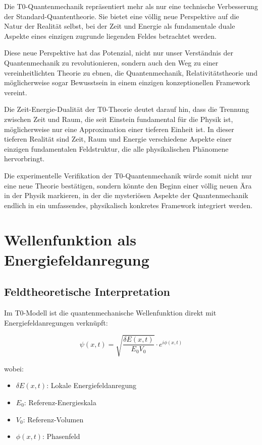\documentclass[12pt,a4paper]{article}
\newcommand{\deltaE}{\delta E}
\theoremstyle{definition}
\theoremstyle{remark}
\begin{document}
Die T0-Quantenmechanik repräsentiert mehr als nur eine technische Verbesserung der Standard-Quantentheorie. Sie bietet eine völlig neue Perspektive auf die Natur der Realität selbst, bei der Zeit und Energie als fundamentale duale Aspekte eines einzigen zugrunde liegenden Feldes betrachtet werden.

Diese neue Perspektive hat das Potenzial, nicht nur unser Verständnis der Quantenmechanik zu revolutionieren, sondern auch den Weg zu einer vereinheitlichten Theorie zu ebnen, die Quantenmechanik, Relativitätstheorie und möglicherweise sogar Bewusstsein in einem einzigen konzeptionellen Framework vereint.

Die Zeit-Energie-Dualität der T0-Theorie deutet darauf hin, dass die Trennung zwischen Zeit und Raum, die seit Einstein fundamental für die Physik ist, möglicherweise nur eine Approximation einer tieferen Einheit ist. In dieser tieferen Realität sind Zeit, Raum und Energie verschiedene Aspekte einer einzigen fundamentalen Feldstruktur, die alle physikalischen Phänomene hervorbringt.

Die experimentelle Verifikation der T0-Quantenmechanik würde somit nicht nur eine neue Theorie bestätigen, sondern könnte den Beginn einer völlig neuen Ära in der Physik markieren, in der die mysteriösen Aspekte der Quantenmechanik endlich in ein umfassendes, physikalisch konkretes Framework integriert werden.
\section{Wellenfunktion als Energiefeldanregung}

\subsection{Feldtheoretische Interpretation}

Im T0-Modell ist die quantenmechanische Wellenfunktion direkt mit Energiefeldanregungen verknüpft:

\begin{equation}
	\boxed{\psi(x,t) = \sqrt{\frac{\deltaE(x,t)}{E_0 V_0}} \cdot e^{i\phi(x,t)}}
	\label{eq:wavefunction_field}
\end{equation}

wobei:
\begin{itemize}
	\item $\deltaE(x,t)$: Lokale Energiefeldanregung
	\item $E_0$: Referenz-Energieskala
	\item $V_0$: Referenz-Volumen
	\item $\phi(x,t)$: Phasenfeld
\end{itemize}
\end{document}
